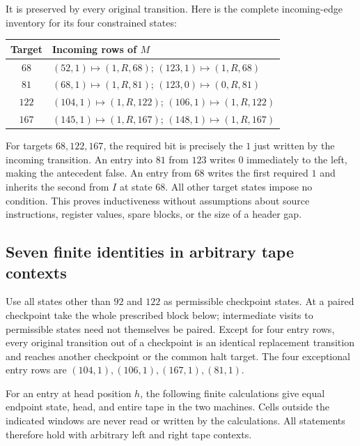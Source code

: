It is preserved by every original transition.  Here is the complete
incoming-edge inventory for its four constrained states:
\begin{center}
\begin{tabular}{cl}
\hline
Target & Incoming rows of $M$\\
\hline
$68$  & $(52,1)\mapsto(1,R,68)$;
         $(123,1)\mapsto(1,R,68)$\\
$81$  & $(68,1)\mapsto(1,R,81)$;
         $(123,0)\mapsto(0,R,81)$\\
$122$ & $(104,1)\mapsto(1,R,122)$;
         $(106,1)\mapsto(1,R,122)$\\
$167$ & $(145,1)\mapsto(1,R,167)$;
         $(148,1)\mapsto(1,R,167)$\\
\hline
\end{tabular}
\end{center}
For targets $68,122,167$, the required bit is precisely the $1$ just
written by the incoming transition.  An entry into $81$ from $123$ writes
$0$ immediately to the left, making the antecedent false.  An entry from
$68$ writes the first required $1$ and inherits the second from $I$ at
state $68$.  All other target states impose no condition.  This proves
inductiveness without assumptions about source instructions, register
values, spare blocks, or the size of a header gap.

\subsection{Seven finite identities in arbitrary tape contexts}

Use all states other than $92$ and $122$ as permissible checkpoint
states. At a paired checkpoint take the whole prescribed block below;
intermediate visits to permissible states need not themselves be paired.  Except for four
entry rows, every original transition out of a checkpoint is an identical
replacement transition and reaches another checkpoint or the common halt
target.  The four exceptional entry rows are
$(104,1),(106,1),(167,1),(81,1)$.

For an entry at head position $h$, the following finite calculations give
equal endpoint state, head, and entire tape in the two machines.  Cells
outside the indicated windows are never read or written by the
calculations.  All statements therefore hold with arbitrary left and
right tape contexts.

